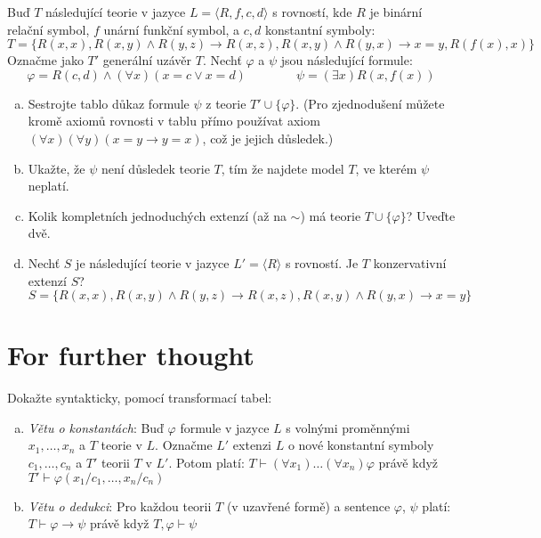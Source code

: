 \begin{problem} 

    Buď $T$ následující teorie v jazyce $L=\langle R,f,c,d\rangle$ s rovností, kde $R$ je binární relační symbol,  $f$ unární funkční symbol, a $c,d$ konstantní symboly:
    $$
    T=\{R(x,x),R(x,y)\wedge R(y,z)\to R(x,z),R(x,y)\wedge R(y,x)\to x=y,R(f(x),x)\}
    $$
    Označme jako $T'$ generální uzávěr $T$. Nechť $\varphi$ a $\psi$ jsou následující formule:
    $$
    \varphi = R(c,d) \wedge (\forall x)(x=c\vee x=d)\qquad\qquad
    \psi = (\exists x)R(x,f(x))
    $$
    \begin{enumerate}[(a)]
        \item Sestrojte tablo důkaz formule $\psi$ z teorie $T'\cup\{\varphi\}$. (Pro zjednodušení můžete kromě axiomů rovnosti v tablu přímo používat axiom $(\forall x)(\forall y)(x=y\to y=x)$, což je jejich důsledek.)
        \item Ukažte, že $\psi$ není důsledek teorie $T$, tím že najdete model $T$, ve kterém $\psi$ neplatí.
        \item Kolik kompletních jednoduchých extenzí (až na $\sim$) má teorie $T\cup \{\varphi\}$? Uveďte dvě.
        \item Nechť $S$ je následující teorie v jazyce $L'=\langle R\rangle$ s rovností. Je $T$ konzervativní extenzí $S$?
        $$S=\{R(x,x),R(x,y)\wedge R(y,z)\to R(x,z),R(x,y)\wedge R(y,x)\to x=y\}$$     
    \end{enumerate}

\end{problem}


\section*{For further thought}


\begin{problem} 
    
    Dokažte syntakticky, pomocí transformací tabel:
    \begin{enumerate}[(a)]
        \item \emph{Větu o konstantách}: Buď $\varphi$ formule v jazyce $L$ s volnými proměnnými $x_1,\dots,x_n$ a $T$ teorie v $L$. Označme $L'$ extenzi $L$ o nové konstantní symboly $c_1,\dots,c_n$ a $T'$ teorii $T$ v $L'$. Potom platí:
        $T \vdash (\forall x_1)\dots(\forall x_n)\varphi$ právě když $T'\vdash\varphi(x_1/c_1,\dots,x_n/c_n)$
        \item \emph{Větu o dedukci}: Pro každou teorii $T$ (v uzavřené formě) a sentence $\varphi$, $\psi$ platí: $T\vdash \varphi\to\psi$ právě když $T,\varphi\vdash\psi$
    \end{enumerate}

\end{problem}


